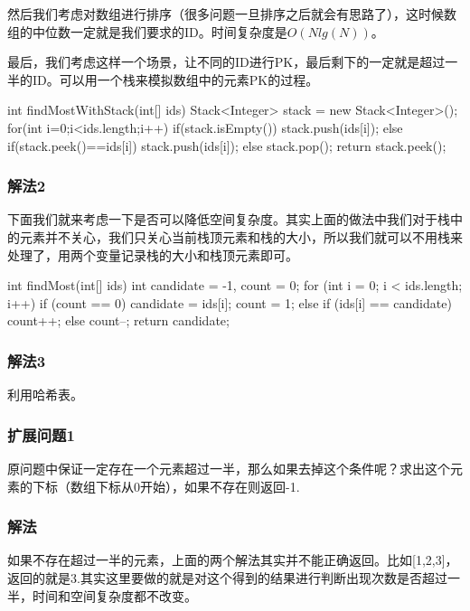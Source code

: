 然后我们考虑对数组进行排序（很多问题一旦排序之后就会有思路了），这时候数组的中位数一定就是我们要求的ID。时间复杂度是$O(Nlg(N))$。

最后，我们考虑这样一个场景，让不同的ID进行PK，最后剩下的一定就是超过一半的ID。可以用一个栈来模拟数组中的元素PK的过程。

\begin{Codex}[label={[$O(N)+O(N)$]Chap02_03_WaterKing.java}]
int findMostWithStack(int[] ids) {
    Stack<Integer> stack = new Stack<Integer>();
    for(int i=0;i<ids.length;i++) {
        if(stack.isEmpty()) {
            stack.push(ids[i]);
        } else {
            if(stack.peek()==ids[i]) stack.push(ids[i]);
            else stack.pop();
        }
    }
    return stack.peek();
}
\end{Codex}

\subsubsection{解法2}
下面我们就来考虑一下是否可以降低空间复杂度。其实上面的做法中我们对于栈中的元素并不关心，我们只关心当前栈顶元素和栈的大小，所以我们就可以不用栈来处理了，用两个变量记录栈的大小和栈顶元素即可。

\begin{Codex}[label={[$O(N)+O(1)$]Chap02_03_WaterKing.java}]
int findMost(int[] ids) {
    int candidate = -1, count = 0;
    for (int i = 0; i < ids.length; i++) {
        if (count == 0) {
            candidate = ids[i];
            count = 1;
        } else {
            if (ids[i] == candidate) count++;
            else count--;
        }
    }
    return candidate;
}
\end{Codex}

\subsubsection{解法3}
利用哈希表。


\subsubsection{扩展问题1}
原问题中保证一定存在一个元素超过一半，那么如果去掉这个条件呢？求出这个元素的下标（数组下标从0开始），如果不存在则返回-1.

\subsubsection{解法}
如果不存在超过一半的元素，上面的两个解法其实并不能正确返回。比如[1,2,3]，返回的就是3.其实这里要做的就是对这个得到的结果进行判断出现次数是否超过一半，时间和空间复杂度都不改变。

